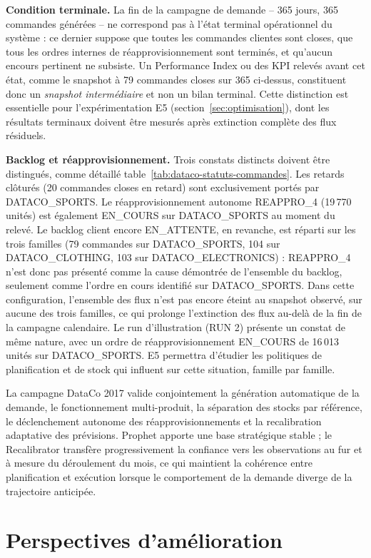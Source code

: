 \documentclass[11pt,a4paper]{article}
\begin{document}
\textbf{Condition terminale.} La fin de la campagne de demande -- 365 jours, 365 commandes générées -- ne correspond pas à l'état terminal opérationnel du système : ce dernier suppose que toutes les commandes clientes sont closes, que tous les ordres internes de réapprovisionnement sont terminés, et qu'aucun encours pertinent ne subsiste. Un Performance Index ou des KPI relevés avant cet état, comme le snapshot à 79 commandes closes sur 365 ci-dessus, constituent donc un \emph{snapshot intermédiaire} et non un bilan terminal. Cette distinction est essentielle pour l'expérimentation E5 (section~\ref{sec:optimisation}), dont les résultats terminaux doivent être mesurés après extinction complète des flux résiduels.

\textbf{Backlog et réapprovisionnement.} Trois constats distincts doivent être distingués, comme détaillé table~\ref{tab:dataco-statuts-commandes}. Les retards clôturés (20 commandes closes en retard) sont exclusivement portés par DATACO\_SPORTS. Le réapprovisionnement autonome REAPPRO\_4 (19\,770 unités) est également EN\_COURS sur DATACO\_SPORTS au moment du relevé. Le backlog client encore EN\_ATTENTE, en revanche, est réparti sur les trois familles (79 commandes sur DATACO\_SPORTS, 104 sur DATACO\_CLOTHING, 103 sur DATACO\_ELECTRONICS) : REAPPRO\_4 n'est donc pas présenté comme la cause démontrée de l'ensemble du backlog, seulement comme l'ordre en cours identifié sur DATACO\_SPORTS. Dans cette configuration, l'ensemble des flux n'est pas encore éteint au snapshot observé, sur aucune des trois familles, ce qui prolonge l'extinction des flux au-delà de la fin de la campagne calendaire. Le run d'illustration (RUN 2) présente un constat de même nature, avec un ordre de réapprovisionnement EN\_COURS de 16\,013 unités sur DATACO\_SPORTS. E5 permettra d'étudier les politiques de planification et de stock qui influent sur cette situation, famille par famille.

La campagne DataCo 2017 valide conjointement la génération automatique de la demande, le fonctionnement multi-produit, la séparation des stocks par référence, le déclenchement autonome des réapprovisionnements et la recalibration adaptative des prévisions. Prophet apporte une base stratégique stable ; le Recalibrator transfère progressivement la confiance vers les observations au fur et à mesure du déroulement du mois, ce qui maintient la cohérence entre planification et exécution lorsque le comportement de la demande diverge de la trajectoire anticipée.

\section{Perspectives d'amélioration}
\end{document}
